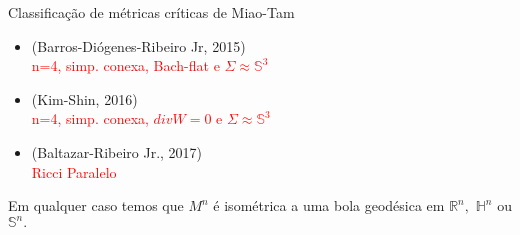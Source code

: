 \documentclass[blue]{beamer}
\begin{document}
\begin{frame}
\begin{block}{Classificação de métricas críticas de Miao-Tam}
	\begin{itemize}
			\item (Barros-Diógenes-Ribeiro Jr, 2015)\\
		\checkmark \textcolor{red}{n=4, simp. conexa, Bach-flat e $\Sigma \approx \mathbb{S}^{3}$}\pause
	
		\item (Kim-Shin, 2016)\\
	\checkmark \textcolor{red}{n=4, simp. conexa, $divW = 0$ e $\Sigma \approx \mathbb{S}^{3}$ }\pause
	
		\item (Baltazar-Ribeiro Jr., 2017)\\
		\checkmark \textcolor{red}{Ricci Paralelo}
	
	\end{itemize}\pause
	
\end{block}
\begin{block}{}
	Em qualquer caso temos que $M^n$ é isométrica a uma bola geodésica em $\mathbb{R}^n,$ $\mathbb{H}^n$ ou $\mathbb{S}^n.$
\end{block}
\end{frame}










\end{document}
